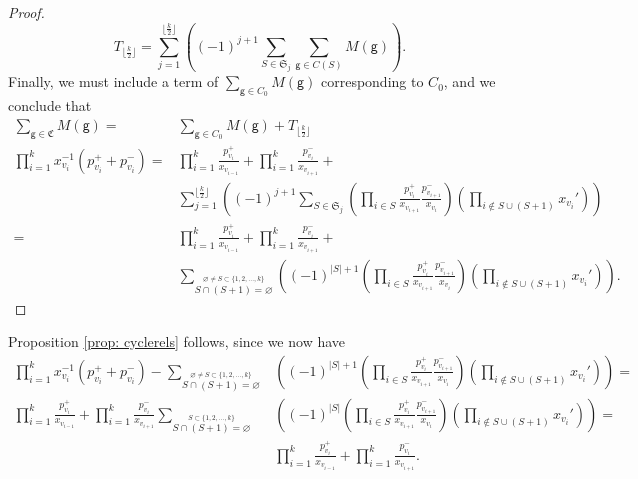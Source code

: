 \documentclass[ALCO,published]{cedram}
\numberwithin{equation}{section}
\newcommand{\C}{\mathbb{C}}
\renewcommand{\phi}{\varphi}
\renewcommand{\emptyset}{\varnothing}
\newcommand{\1}{^{-1}}
\begin{document}
\begin{proof}
\[
T_{\lfloor \frac k2 \rfloor} = \sum_{j=1}^{\lfloor \frac k2 \rfloor}\left((-1)^{j+1} \sum_{S \in \mathfrak S_j} \sum_{\mathsf g \in C(S)} M(\mathsf g)\right).
\]
Finally, we must include a term of $\sum_{\mathsf g \in C_0} M(\mathsf g)$ corresponding to $C_0$, and we conclude that
\begin{align*}
\sum_{\mathsf g \in \mathfrak C} M(\mathsf g) =&\sum_{\mathsf g \in C_0} M(\mathsf g) + T_{\lfloor \frac k2 \rfloor}\\
\prod_{i=1}^k x_{v_i}\1 (p_{v_i}^+ + p_{v_i}^-) =& \prod_{i=1}^k \frac{p_{v_i}^+}{x_{v_{i-1}}} + \prod_{i=1}^k \frac{p_{v_i}^-}{x_{v_{i+1}}} +\\
&\sum_{j=1}^{\lfloor \frac k2 \rfloor}\left((-1)^{j+1} \sum_{S \in \mathfrak S_j} \left(\prod_{i\in S} \frac{p_{v_i}^+}{x_{v_{i+1}}}\frac{p_{v_{i+1}}^-}{x_{v_i}}\right) \left(\prod_{i \notin S \cup (S+1)} \!\!\!x_{v_i}'\right)\right) \\
=& \prod_{i=1}^k \frac{p_{v_i}^+}{x_{v_{i-1}}} +\prod_{i=1}^k \frac{p_{v_i}^-}{x_{v_{i+1}}} + \\
&\sum_{\stackrel{\emptyset \neq S\subset \{1,2,\dots,k\}}{S\cap (S+1)=\emptyset}} \left((-1)^{|S|+1} \left(\prod_{i\in S} \frac{p_{v_i}^+}{x_{v_{i+1}}}\frac{p_{v_{i+1}}^-}{x_{v_i}}\right) \left(\prod_{i \notin S \cup (S+1)} \!\!\!x_{v_i}'\right)\right).
\end{align*}
\end{proof}
Proposition \ref{prop: cyclerels} follows, since we now have
\begin{align*}
\prod_{i=1}^k x_{v_i}\1 (p_{v_i}^+ + p_{v_i}^-) - \sum_{\stackrel{\emptyset \neq S\subset \{1,2,\dots,k\}}{S\cap (S+1)=\emptyset}} &\left((-1)^{|S|+1} \left(\prod_{i\in S} \frac{p_{v_i}^+}{x_{v_{i+1}}}\frac{p_{v_{i+1}}^-}{x_{v_i}}\right) \left(\prod_{i \notin S \cup (S+1)} \!\!\!x_{v_i}'\right)\right)=\\
	 \prod_{i=1}^k \frac{p_{v_i}^+}{x_{v_{i-1}}} + \prod_{i=1}^k \frac{p_{v_i}^-}{x_{v_{i+1}}}
\sum_{\stackrel{S\subset \{1,2,\dots,k\}}{S\cap (S+1)=\emptyset}} &\left((-1)^{|S|} \left(\prod_{i\in S} \frac{p_{v_i}^+}{x_{v_{i+1}}}\frac{p_{v_{i+1}}^-}{x_{v_i}}\right) \left(\prod_{i \notin S \cup (S+1)} \!\!\!x_{v_i}'\right)\right) =\\
& \prod_{i=1}^k\frac{p_{v_i}^+}{x_{v_{i-1}}}+ \prod_{i=1}^k\frac{p_{v_i}^-}{x_{v_{i+1}}}.
\end{align*}

\end{document}
